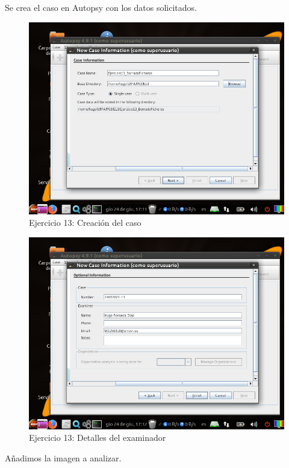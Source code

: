 \documentclass[11pt]{article}
\begin{document}
Se crea el caso en Autopsy con los datos solicitados.

\begin{figure}[H]
    \caption{Ejercicio 13: Creación del caso}
    \centering
    \includegraphics[scale=0.7]{p03/e13-1.png}
\end{figure}

\begin{figure}[H]
    \caption{Ejercicio 13: Detalles del examinador}
    \centering
    \includegraphics[scale=0.7]{p03/e13-2.png}
\end{figure}

Añadimos la imagen a analizar.
\end{document}
